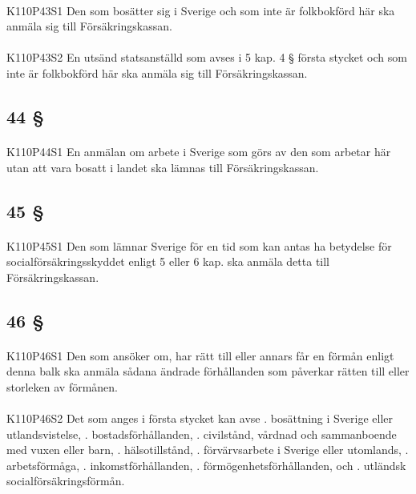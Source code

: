 \documentclass[a4paper,notitlepage,openany,10pt]{book}
\begin{document}
\paragraph*{}
{\tiny K110P43S1}
Den som bosätter sig i Sverige och som inte är folkbokförd här ska anmäla sig till Försäkringskassan.
\paragraph*{}
{\tiny K110P43S2}
En utsänd statsanställd som avses i 5 kap. 4 § första stycket och som inte är folkbokförd här ska anmäla sig till Försäkringskassan.
\subsection*{44 §}
\paragraph*{}
{\tiny K110P44S1}
En anmälan om arbete i Sverige som görs av den som arbetar här utan att vara bosatt i landet ska lämnas till Försäkringskassan.
\subsection*{45 §}
\paragraph*{}
{\tiny K110P45S1}
Den som lämnar Sverige för en tid som kan antas ha betydelse för socialförsäkringsskyddet enligt 5 eller 6 kap.
ska anmäla detta till Försäkringskassan.
\subsection*{46 §}
\paragraph*{}
{\tiny K110P46S1}
Den som ansöker om, har rätt till eller annars får en förmån enligt denna balk ska anmäla sådana ändrade förhållanden som påverkar rätten till eller storleken av förmånen.
\paragraph*{}
{\tiny K110P46S2}
Det som anges i första stycket kan avse
. bosättning i Sverige eller utlandsvistelse,
. bostadsförhållanden,
. civilstånd, vårdnad och sammanboende med vuxen eller barn,
. hälsotillstånd,
. förvärvsarbete i Sverige eller utomlands,
. arbetsförmåga,
. inkomstförhållanden,
. förmögenhetsförhållanden, och
. utländsk socialförsäkringsförmån.
\end{document}
